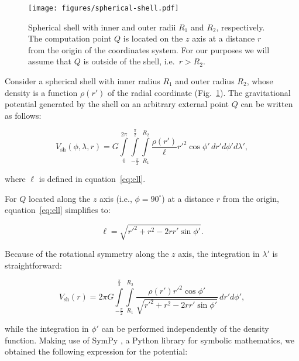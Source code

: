 \documentclass[extra, referee]{gji}
\begin{document}
\begin{figure}
\centering
\texttt{[image: figures/spherical-shell.pdf]}
\caption{
    Spherical shell with inner and outer radii $R_1$ and $R_2$, respectively.
    The computation point $Q$ is located on the $z$ axis at a distance $r$ from
    the origin of the coordinates system.
    For our purposes we will assume that $Q$ is outside of the shell,
    i.e.~$r > R_2$.
}
\label{fig:spherical-shell}
\end{figure}

Consider a spherical shell with inner radius $R_1$ and outer radius $R_2$,
whose density is a function $\rho(r')$ of the radial coordinate
(Fig.~\ref{fig:spherical-shell}).
The gravitational potential generated by the shell on an arbitrary external
point $Q$ can be written as follows:

\begin{equation}
    V_\text{sh}(\phi, \lambda, r) = G
    \int\limits_0^{2\pi}
    \int\limits_{-\frac{\pi}{2}}^\frac{\pi}{2}
    \int\limits_{R_1}^{R_2}
    \frac{\rho(r')}{\ell} {r'}^2 \cos\phi' \,
    dr' d\phi' d\lambda',
\end{equation}

\noindent where $\ell$ is defined in equation~\ref{eq:ell}.

For $Q$ located along the $z$ axis (i.e., $\phi=90^\circ$) at a distance $r$ from the
origin, equation~\ref{eq:ell} simplifies to:

\begin{equation}
    \ell = \sqrt{r'^2 + r^2 - 2 r r' \sin\phi'}.
\end{equation}

\noindent
Because of the rotational symmetry along the $z$ axis, the integration in $\lambda'$ is
straightforward:

\begin{equation}
    V_\text{sh}(r) = 2\pi G
    \int\limits_{-\frac{\pi}{2}}^\frac{\pi}{2}
    \int\limits_{R_1}^{R_2}
    \frac{\rho(r') {r'}^2 \cos\phi'}{\sqrt{r'^2 + r^2 - 2 r r' \sin\phi'}}
    \, dr' d\phi',
\end{equation}

\noindent
while the integration in $\phi'$ can be performed independently of the density function.
Making use of SymPy \citep{sympy2017}, a Python library for symbolic mathematics, we
obtained the following expression for the potential:

\end{document}
